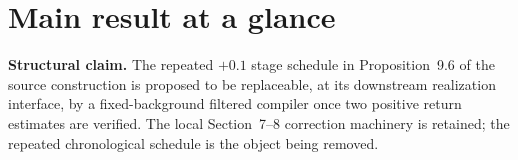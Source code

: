 \documentclass[11pt]{article}
\numberwithin{equation}{section}
\theoremstyle{highend}
\theoremstyle{definition}
\begin{document}
\clearpage
\section*{Main result at a glance}

\begin{keybox}
\textbf{Structural claim.}
The repeated $+0.1$ stage schedule in Proposition~9.6 of the source construction is proposed to be replaceable, at its downstream realization interface, by a fixed-background filtered compiler once two positive return estimates are verified. The local Section~7--8 correction machinery is retained; the repeated chronological schedule is the object being removed.
\end{keybox}
\end{document}

